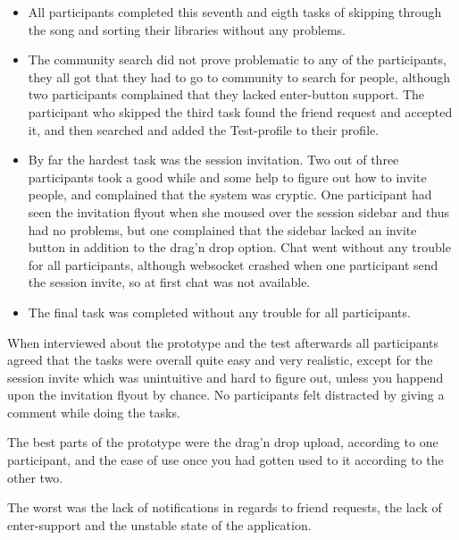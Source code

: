 \begin{itemize}
	\item All participants completed this seventh and eigth tasks of skipping through the song and sorting their libraries without any problems.
	\item The community search did not prove problematic to any of the participants, they all got that they had to go to community to search for people, although two participants complained that they lacked enter-button support. The participant who skipped the third task found the friend request and accepted it, and then searched and added the Test-profile to their profile.
	\item By far the hardest task was the session invitation. Two out of three participants took a good while and some help to figure out how to invite people, and complained that the system was cryptic. One participant had seen the invitation flyout when she moused over the session sidebar and thus had no problems, but one complained that the sidebar lacked an invite button in addition to the drag'n drop option. Chat went without any trouble for all participants, although websocket crashed when one participant send the session invite, so at first chat was not available.
	\item The final task was completed without any trouble for all participants.
\end{itemize}

When interviewed about the prototype and the test afterwards all participants agreed that the tasks were overall quite easy and very realistic, except for the session invite which was unintuitive and hard to figure out, unless you happend upon the invitation flyout by chance. No participants felt distracted by giving a comment while doing the tasks. 

The best parts of the prototype were the drag'n drop upload, according to one participant, and the ease of use once you had gotten used to it according to the other two. 

The worst was the lack of notifications in regards to friend requests, the lack of enter-support and the unstable state of the application.